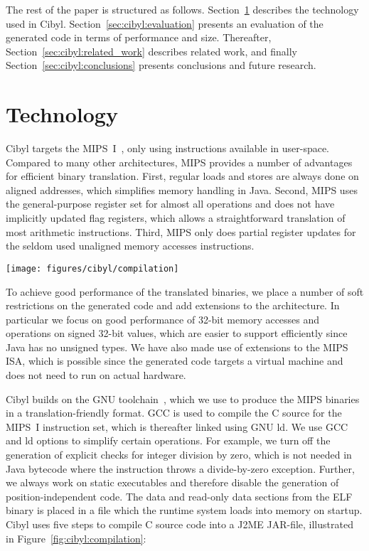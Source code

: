 The rest of the paper is structured as follows. Section~\ref{sec:cibyl:technology}
describes the technology used in Cibyl. Section~\ref{sec:cibyl:evaluation} presents
an evaluation of the generated code in terms of performance and size.
Thereafter, Section~\ref{sec:cibyl:related_work} describes related work, and finally
Section~\ref{sec:cibyl:conclusions} presents conclusions and future research.

\section{Technology}
\label{sec:cibyl:technology}
Cibyl targets the MIPS~I~\cite{kane88mips}, only using instructions available
in user-space. Compared to many other architectures, MIPS provides a number of
advantages for efficient binary translation. First, regular loads and stores
are always done on aligned addresses, which simplifies memory handling in
Java.  Second, MIPS uses the general-purpose register set for almost all
operations and does not have implicitly updated flag registers, which allows a
straightforward translation of most arithmetic instructions.  Third, MIPS only
does partial register updates for the seldom used unaligned memory accesses
instructions.

\begin{figure*}[htb]
  \begin{center}
    \texttt{[image: figures/cibyl/compilation]}
    \caption[Cibyl translation process]{The compilation process. Gray boxes show third-party tools and
      white boxes are implemented in Cibyl.}
    \label{fig:cibyl:compilation}
  \end{center}
\end{figure*}

To achieve good performance of the translated binaries, we place a number of
soft restrictions on the generated code and add extensions to the
architecture. In particular we focus on good performance of 32-bit memory
accesses and operations on signed 32-bit values, which are easier to support
efficiently since Java has no unsigned types. We have also made use of
extensions to the MIPS ISA, which is possible since the generated code targets
a virtual machine and does not need to run on actual hardware.

Cibyl builds on the GNU toolchain~\cite{gcc}, which we use to produce the MIPS
binaries in a translation-friendly format. GCC is used to compile the C
source for the MIPS~I instruction set, which is thereafter linked using GNU
ld. We use GCC and ld options to simplify certain operations.  For example, we
turn off the generation of explicit checks for integer division by zero, which
is not needed in Java bytecode where the instruction throws a divide-by-zero
exception. Further, we always work on static executables and therefore disable the
generation of position-independent code. The data and read-only data sections
from the ELF binary is placed in a file which the runtime system loads into
memory on startup. Cibyl uses five steps to compile C source code into a J2ME
JAR-file, illustrated in Figure~\ref{fig:cibyl:compilation}:

